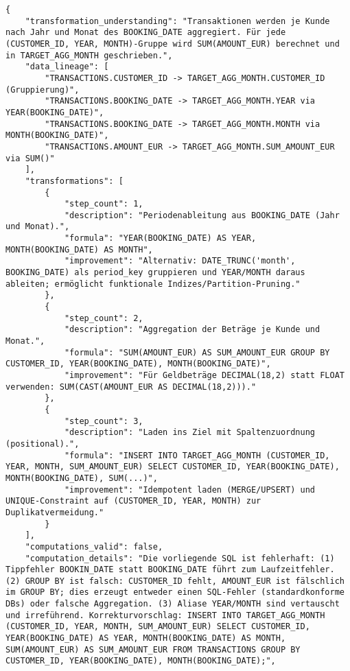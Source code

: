 \begin{lstlisting}[caption={Ausgabe: GPT-5 Anwendungsfall 1 Konsistenzdurchlauf},label={gpt_case1_prompt2}]
{
    "transformation_understanding": "Transaktionen werden je Kunde nach Jahr und Monat des BOOKING_DATE aggregiert. Für jede (CUSTOMER_ID, YEAR, MONTH)-Gruppe wird SUM(AMOUNT_EUR) berechnet und in TARGET_AGG_MONTH geschrieben.",
    "data_lineage": [
        "TRANSACTIONS.CUSTOMER_ID -> TARGET_AGG_MONTH.CUSTOMER_ID (Gruppierung)",
        "TRANSACTIONS.BOOKING_DATE -> TARGET_AGG_MONTH.YEAR via YEAR(BOOKING_DATE)",
        "TRANSACTIONS.BOOKING_DATE -> TARGET_AGG_MONTH.MONTH via MONTH(BOOKING_DATE)",
        "TRANSACTIONS.AMOUNT_EUR -> TARGET_AGG_MONTH.SUM_AMOUNT_EUR via SUM()"
    ],
    "transformations": [
        {
            "step_count": 1,
            "description": "Periodenableitung aus BOOKING_DATE (Jahr und Monat).",
            "formula": "YEAR(BOOKING_DATE) AS YEAR, MONTH(BOOKING_DATE) AS MONTH",
            "improvement": "Alternativ: DATE_TRUNC('month', BOOKING_DATE) als period_key gruppieren und YEAR/MONTH daraus ableiten; ermöglicht funktionale Indizes/Partition-Pruning."
        },
        {
            "step_count": 2,
            "description": "Aggregation der Beträge je Kunde und Monat.",
            "formula": "SUM(AMOUNT_EUR) AS SUM_AMOUNT_EUR GROUP BY CUSTOMER_ID, YEAR(BOOKING_DATE), MONTH(BOOKING_DATE)",
            "improvement": "Für Geldbeträge DECIMAL(18,2) statt FLOAT verwenden: SUM(CAST(AMOUNT_EUR AS DECIMAL(18,2)))."
        },
        {
            "step_count": 3,
            "description": "Laden ins Ziel mit Spaltenzuordnung (positional).",
            "formula": "INSERT INTO TARGET_AGG_MONTH (CUSTOMER_ID, YEAR, MONTH, SUM_AMOUNT_EUR) SELECT CUSTOMER_ID, YEAR(BOOKING_DATE), MONTH(BOOKING_DATE), SUM(...)",
            "improvement": "Idempotent laden (MERGE/UPSERT) und UNIQUE-Constraint auf (CUSTOMER_ID, YEAR, MONTH) zur Duplikatvermeidung."
        }
    ],
    "computations_valid": false,
    "computation_details": "Die vorliegende SQL ist fehlerhaft: (1) Tippfehler BOOKIN_DATE statt BOOKING_DATE führt zum Laufzeitfehler. (2) GROUP BY ist falsch: CUSTOMER_ID fehlt, AMOUNT_EUR ist fälschlich im GROUP BY; dies erzeugt entweder einen SQL-Fehler (standardkonforme DBs) oder falsche Aggregation. (3) Aliase YEAR/MONTH sind vertauscht und irreführend. Korrekturvorschlag: INSERT INTO TARGET_AGG_MONTH (CUSTOMER_ID, YEAR, MONTH, SUM_AMOUNT_EUR) SELECT CUSTOMER_ID, YEAR(BOOKING_DATE) AS YEAR, MONTH(BOOKING_DATE) AS MONTH, SUM(AMOUNT_EUR) AS SUM_AMOUNT_EUR FROM TRANSACTIONS GROUP BY CUSTOMER_ID, YEAR(BOOKING_DATE), MONTH(BOOKING_DATE);",

\end{lstlisting}

